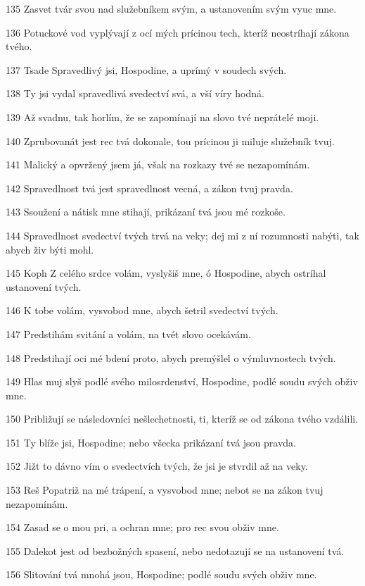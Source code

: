 \par 135 Zasvet tvár svou nad služebníkem svým, a ustanovením svým vyuc mne.
\par 136 Potuckové vod vyplývají z ocí mých prícinou tech, kteríž neostríhají zákona tvého.
\par 137 Tsade Spravedlivý jsi, Hospodine, a uprímý v soudech svých.
\par 138 Ty jsi vydal spravedlivá svedectví svá, a vší víry hodná.
\par 139 Až svadnu, tak horlím, že se zapomínají na slovo tvé neprátelé moji.
\par 140 Zprubovanát jest rec tvá dokonale, tou prícinou ji miluje služebník tvuj.
\par 141 Malický a opvržený jsem já, však na rozkazy tvé se nezapomínám.
\par 142 Spravedlnost tvá jest spravedlnost vecná, a zákon tvuj pravda.
\par 143 Ssoužení a nátisk mne stihají, prikázaní tvá jsou mé rozkoše.
\par 144 Spravedlnost svedectví tvých trvá na veky; dej mi z ní rozumnosti nabýti, tak abych živ býti mohl.
\par 145 Koph Z celého srdce volám, vyslyšiš mne, ó Hospodine, abych ostríhal ustanovení tvých.
\par 146 K tobe volám, vysvobod mne, abych šetril svedectví tvých.
\par 147 Predstihám svitání a volám, na tvét slovo ocekávám.
\par 148 Predstihají oci mé bdení proto, abych premýšlel o výmluvnostech tvých.
\par 149 Hlas muj slyš podlé svého milosrdenství, Hospodine, podlé soudu svých obživ mne.
\par 150 Približují se následovníci nešlechetnosti, ti, kteríž se od zákona tvého vzdálili.
\par 151 Ty blíže jsi, Hospodine; nebo všecka prikázaní tvá jsou pravda.
\par 152 Jižt to dávno vím o svedectvích tvých, že jsi je stvrdil až na veky.
\par 153 Reš Popatriž na mé trápení, a vysvobod mne; nebot se na zákon tvuj nezapomínám.
\par 154 Zasad se o mou pri, a ochran mne; pro rec svou obživ mne.
\par 155 Dalekot jest od bezbožných spasení, nebo nedotazují se na ustanovení tvá.
\par 156 Slitování tvá mnohá jsou, Hospodine; podlé soudu svých obživ mne.
